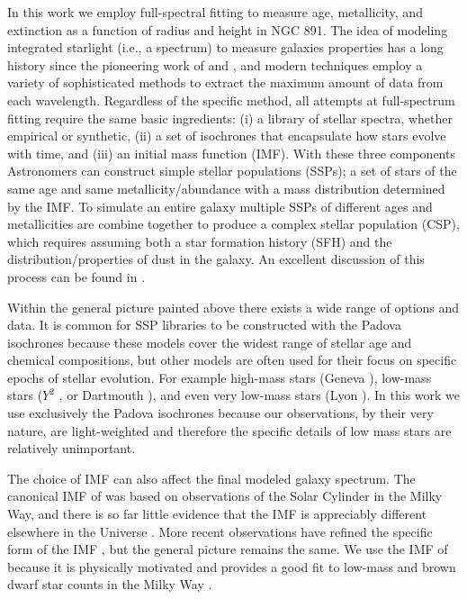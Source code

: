 In this work we employ full-spectral fitting to measure age,
metallicity, and extinction as a function of radius and height in NGC
891. The idea of modeling integrated starlight (i.e., a spectrum) to
measure galaxies properties has a long history since the pioneering
work of \citet{Tinsley68} and \citet{Spinrad71}, and modern techniques
employ a variety of sophisticated methods to extract the maximum
amount of data from each wavelength. Regardless of the specific
method, all attempts at full-spectrum fitting require the same basic
ingredients: (i) a library of stellar spectra, whether empirical or
synthetic, (ii) a set of isochrones that encapsulate how stars evolve
with time, and (iii) an initial mass function (IMF). With these three
components Astronomers can construct simple stellar populations
(SSPs); a set of stars of the same age and same metallicity/abundance
with a mass distribution determined by the IMF. To simulate an entire
galaxy multiple SSPs of different ages and metallicities are combine
together to produce a complex stellar population (CSP), which requires
assuming both a star formation history (SFH) and the
distribution/properties of dust in the galaxy. An excellent discussion
of this process can be found in \citet[and his diagram shown in Figure
\ref{intro:fig:conroy}]{Conroy13}.

Within the general picture painted above there exists a wide range of
options and data. It is common for SSP libraries to be constructed
with the Padova isochrones \citep{Bertelli94, Girardi00, Marigo08}
because these models cover the widest range of stellar age and
chemical compositions, but other models are often used for their focus
on specific epochs of stellar evolution. For example high-mass stars
(Geneva \citep{Schaller92,Meynet00}), low-mass stars ($Y^2$
\citep{Yi01,Yi03}, or Dartmouth \citep{Dotter08}), and even very
low-mass stars (Lyon \citep{Chabrier97,Baraffe98}). In this work we
use exclusively the Padova isochrones because our observations, by
their very nature, are light-weighted and therefore the specific
details of low mass stars are relatively unimportant.

The choice of IMF can also affect the final modeled galaxy
spectrum. The canonical IMF of \citet{Salpeter55} was based on
observations of the Solar Cylinder in the Milky Way, and there is so
far little evidence that the IMF is appreciably different elsewhere in
the Universe \citep{Bastian10}. More recent observations have refined
the specific form of the IMF \citep{Kroupa01, Chabrier03}, but the
general picture remains the same. We use the IMF of \citet{Chabrier03}
because it is physically motivated and provides a good fit to low-mass
and brown dwarf star counts in the Milky Way
\citep{Bruzual03,Chabrier01,Chabrier03}.

